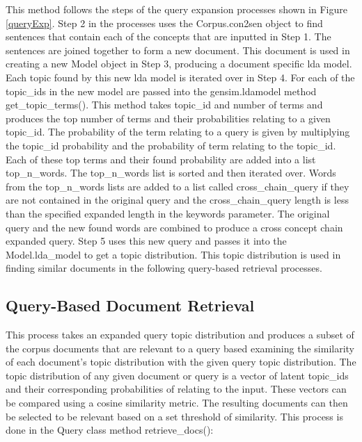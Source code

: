 This method follows the steps of the query expansion processes shown in Figure \ref{queryExp}. Step 2 in the processes uses the Corpus.con2sen object to find sentences that contain each of the concepts that are inputted in Step 1. The sentences are joined together to form a new document. This document is used in creating a new Model object in Step 3, producing a document specific lda model. Each topic found by this new lda model is iterated over in Step 4. For each of the topic\_ids in the new model are passed into the gensim.ldamodel method get\_topic\_terms(). This method takes topic\_id and number of terms and produces the top number of terms and their probabilities relating to a given topic\_id. The probability of the term relating to a query is given by  multiplying  the topic\_id probability and the probability of term relating to the topic\_id. Each of these top terms and their found probability are added into a list top\_n\_words. The top\_n\_words list is sorted and then iterated over. Words from the top\_n\_words lists are added to a list called cross\_chain\_query if they are not contained in the original query and the cross\_chain\_query length is less than the specified expanded length in the keywords parameter. The original query and  the new found words are combined to produce a cross concept chain expanded query. Step 5 uses this new query and passes it into the Model.lda\_model to get a topic distribution. This topic distribution is used in finding similar documents in the following query-based retrieval processes.

\subsection{Query-Based Document Retrieval}
This process takes an expanded query topic distribution and produces a subset of the corpus documents that are relevant to a query based examining the similarity of each document's topic distribution with the given query topic distribution. The topic distribution of any given document or query is a vector of latent topic\_ids and their corresponding probabilities of relating to the input. These vectors can be compared using a cosine similarity metric. The resulting documents can then be selected to be relevant based on a set threshold of similarity. This process is done in the Query class method retrieve\_docs():

